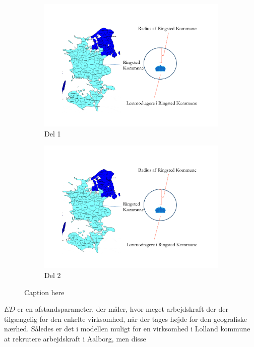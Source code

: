 \documentclass[a4paper, 12pt, titlepage]{article}
\begin{document}
\begin{figure}[tb]
    \centering
    \begin{subfigure}[b]{0.49\textwidth}
        \includegraphics[width=\textwidth]{del1.pdf}
        \caption{Del 1}
        \label{fig:del1}
    \end{subfigure}
    \begin{subfigure}[b]{0.49\textwidth}
        \includegraphics[width=\textwidth]{del1.pdf}
        \caption{Del 2}
        \label{fig:del2}
    \end{subfigure}
	\caption{Caption here}
	\label{fig:SimonsFigur1}
\end{figure}
  

$ED$ er en afstandsparameter, der måler, hvor meget arbejdskraft der der tilgængelig for den enkelte virksomhed, når der tages højde for den geografiske nærhed. Således er det i modellen muligt for en virksomhed i Lolland kommune at rekrutere arbejdskraft i Aalborg, men disse 
\end{document}
